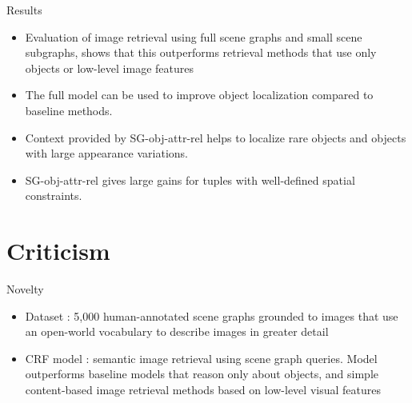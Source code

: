 \documentclass{IFES-beamer}
\begin{document}
    \begin{frame}{Results}
        \begin{itemize}
            \item Evaluation of image retrieval using full scene graphs and small scene subgraphs, shows that this outperforms retrieval methods that use only objects or low-level image features
            \item The full model can be used to improve object localization compared to baseline methods.
            \item Context provided by SG-obj-attr-rel helps to localize rare objects and objects with large appearance variations. 
            \item SG-obj-attr-rel gives large gains for tuples with well-defined spatial constraints.
        \end{itemize}
    \end{frame}
\section{Criticism}
        \begin{frame}{Novelty}
            \begin{itemize}
                \item Dataset : 5,000 human-annotated scene graphs grounded to images that use an open-world vocabulary to describe images in greater detail
            \end{itemize}
            \vspace{4mm}
            \begin{itemize}
                \item CRF model : semantic image retrieval using scene graph queries. Model outperforms baseline models that reason only about objects, and simple content-based image retrieval methods based on low-level visual features
            \end{itemize}
        \end{frame}
        
\end{document}
